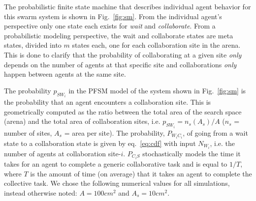 \documentclass{TeXstyles/DARS/svmult}  %
\begin{document}
The probabilistic finite state machine that describes individual agent behavior for this swarm system is shown in Fig.~\ref{fig:sm}. From the individual agent's perspective only one state each exists for \emph{wait} and \emph{collaborate}. From a probabilistic modeling perspective, the wait and collaborate states are meta states, divided into $m$ states each, one for each collaboration site in the arena. This is done to clarify that the probability of collaborating at a given site \emph{only} depends on the number of agents at that specific site and collaborations \emph{only} happen between agents at the same site.

The probability $p_{SW_i}$ in the PFSM model of the system shown in Fig.~\ref{fig:sm} is the probability that an agent encounters a collaboration site. This is geometrically computed as the ratio between the total area of the search space (arena) and the total area of collaboration sites, i.e. $p_{SW_i} = n_s(A_s)/A$ ($n_s$ = number of sites, $A_s$ = area per site). The probability, $P_{W_iC_i}$, of going from a wait state to a collaboration state is given by eq.~\eqref{eq:cdf} with input $N_{W_i}$, i.e. the number of agents at collaboration site-$i$. $P_{C_iS}$ stochastically models the time it takes for an agent to complete a generic collaborative task and is equal to $1/T$, where $T$ is the amount of time (on average) that it takes an agent to complete the collective task. We chose the following numerical values for all simulations, instead otherwise noted: $A=100cm^2$ and $A_s=10cm^2$.

\end{document}
